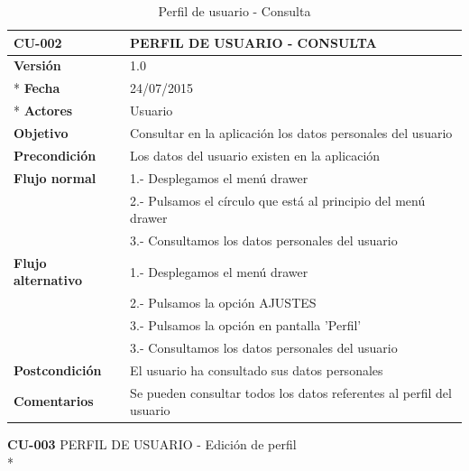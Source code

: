 \documentclass[../pfc.tex]{subfiles}
\begin{document}
	\begin{table}[H]
		\centering
		\begin{tabular}[t]{|p{3cm}|p{9.5cm}|}
			\hline \textbf{CU-002} & \textbf{PERFIL DE USUARIO - CONSULTA} \\*
			\hline\hline \textbf{Versión} & 1.0 \\ *
			\hline\hline \textbf{Fecha} & 24/07/2015 \\ *
			\hline\textbf{Actores} 	& Usuario\\*
			\hline \textbf{Objetivo} & Consultar en la aplicación los datos personales del usuario\\* 			
			\hline \textbf{Precondición} & Los datos del usuario existen en la aplicación \\* 
			\hline \textbf{Flujo normal} & 1.- Desplegamos el menú drawer\\* 
			& 2.- Pulsamos el círculo que está al principio del menú drawer\\*	
			& 3.- Consultamos los datos personales del usuario\\*	
			\hline \textbf{Flujo alternativo} & 1.- Desplegamos el menú drawer\\* 
			& 2.- Pulsamos la opción AJUSTES \\*	
			& 3.- Pulsamos la opción en pantalla 'Perfil' \\*	
			& 3.- Consultamos los datos personales del usuario \\*	
			\hline \textbf{Postcondición} & El usuario ha consultado sus datos personales\\* 
			\hline \textbf{Comentarios}   & Se pueden consultar todos los datos referentes al perfil del usuario\\*
			\hline
		\end{tabular}
		\caption{Perfil de usuario - Consulta}
		\label{tabla:caso002}
	\end{table}
	
	\textbf{CU-003} PERFIL DE USUARIO - Edición de perfil\\*
	
\end{document}
